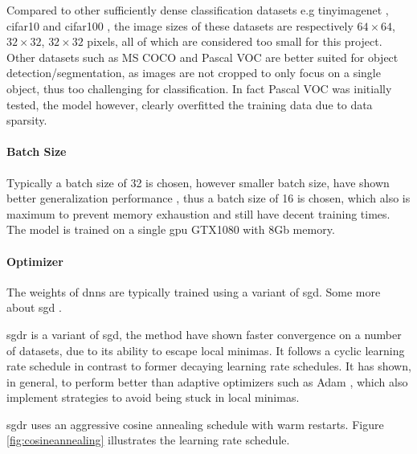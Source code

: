 Compared to other sufficiently dense classification datasets e.g \gls{tinyimagenet} \cite{li_cs231n:_2018}, \gls{cifar10} and \gls{cifar100} \cite{krizhevsky_cifar-10_nodate}, the image sizes of these datasets are respectively $64\times 64$, $32\times 32$, $32\times 32$ pixels, all of which are considered too small  for this project. Other datasets such as MS COCO and Pascal VOC are better suited for object detection/segmentation, as images are not cropped to only focus on a single object, thus too challenging for classification. In fact Pascal VOC was initially tested, the model however, clearly overfitted the training data due to data sparsity. 

\paragraph{Batch Size}

Typically a batch size of 32 is chosen, however smaller batch size, have shown better generalization performance \cite{masters_revisiting_nodate}, thus a batch size of 16 is chosen, which also is maximum to prevent memory exhaustion and still have decent training times. The model is trained on a single \gls{gpu} GTX1080 with 8Gb memory. 

\paragraph{Optimizer}

The weights of \gls{dnn}s are typically trained using a variant of \gls{sgd}. Some more about \gls{sgd} \cite{goodfellow_deep_2016}.

\gls{sgdr} \cite{loshchilov_sgdr:_2016} is a variant of \gls{sgd}, the method have shown faster convergence on a number of datasets, due to its ability to escape local minimas. It follows a cyclic learning rate schedule in contrast to former decaying learning rate schedules. It has shown, in general, to perform better than adaptive optimizers such as Adam \cite{kingma_adam:_2014}, which also implement strategies to avoid being stuck in local minimas. 

\gls{sgdr} uses an aggressive cosine annealing schedule with warm restarts. Figure \ref{fig:cosineannealing} illustrates the learning rate schedule.

